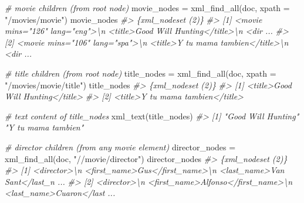 \documentclass[
]{book}
\newenvironment{Shaded}{\begin{snugshade}}{\end{snugshade}}
\newcommand{\AttributeTok}[1]{\textcolor[rgb]{0.77,0.63,0.00}{#1}}
\newcommand{\CommentTok}[1]{\textcolor[rgb]{0.56,0.35,0.01}{\textit{#1}}}
\newcommand{\FunctionTok}[1]{\textcolor[rgb]{0.00,0.00,0.00}{#1}}
\newcommand{\NormalTok}[1]{#1}
\newcommand{\OtherTok}[1]{\textcolor[rgb]{0.56,0.35,0.01}{#1}}
\newcommand{\StringTok}[1]{\textcolor[rgb]{0.31,0.60,0.02}{#1}}
\begin{document}
\begin{Shaded}
\begin{Highlighting}[]
\CommentTok{\# movie children (from root node)}
\NormalTok{movie\_nodes }\OtherTok{=} \FunctionTok{xml\_find\_all}\NormalTok{(doc, }\AttributeTok{xpath =} \StringTok{"/movies/movie"}\NormalTok{)}
\NormalTok{movie\_nodes}
\CommentTok{\#\textgreater{} \{xml\_nodeset (2)\}}
\CommentTok{\#\textgreater{} [1] \textless{}movie mins="126" lang="eng"\textgreater{}\textbackslash{}n  \textless{}title\textgreater{}Good Will Hunting\textless{}/title\textgreater{}\textbackslash{}n  \textless{}dir ...}
\CommentTok{\#\textgreater{} [2] \textless{}movie mins="106" lang="spa"\textgreater{}\textbackslash{}n  \textless{}title\textgreater{}Y tu mama tambien\textless{}/title\textgreater{}\textbackslash{}n  \textless{}dir ...}
\end{Highlighting}
\end{Shaded}

\begin{Shaded}
\begin{Highlighting}[]
\CommentTok{\# title children (from root node)}
\NormalTok{title\_nodes }\OtherTok{=} \FunctionTok{xml\_find\_all}\NormalTok{(doc, }\AttributeTok{xpath =} \StringTok{"/movies/movie/title"}\NormalTok{)}
\NormalTok{title\_nodes}
\CommentTok{\#\textgreater{} \{xml\_nodeset (2)\}}
\CommentTok{\#\textgreater{} [1] \textless{}title\textgreater{}Good Will Hunting\textless{}/title\textgreater{}}
\CommentTok{\#\textgreater{} [2] \textless{}title\textgreater{}Y tu mama tambien\textless{}/title\textgreater{}}
\end{Highlighting}
\end{Shaded}

\begin{Shaded}
\begin{Highlighting}[]
\CommentTok{\# text content of title\_nodes}
\FunctionTok{xml\_text}\NormalTok{(title\_nodes)}
\CommentTok{\#\textgreater{} [1] "Good Will Hunting" "Y tu mama tambien"}
\end{Highlighting}
\end{Shaded}

\begin{Shaded}
\begin{Highlighting}[]
\CommentTok{\# director children (from any movie element)}
\NormalTok{director\_nodes }\OtherTok{=} \FunctionTok{xml\_find\_all}\NormalTok{(doc, }\StringTok{"//movie/director"}\NormalTok{)}
\NormalTok{director\_nodes}
\CommentTok{\#\textgreater{} \{xml\_nodeset (2)\}}
\CommentTok{\#\textgreater{} [1] \textless{}director\textgreater{}\textbackslash{}n  \textless{}first\_name\textgreater{}Gus\textless{}/first\_name\textgreater{}\textbackslash{}n  \textless{}last\_name\textgreater{}Van Sant\textless{}/last\_n ...}
\CommentTok{\#\textgreater{} [2] \textless{}director\textgreater{}\textbackslash{}n  \textless{}first\_name\textgreater{}Alfonso\textless{}/first\_name\textgreater{}\textbackslash{}n  \textless{}last\_name\textgreater{}Cuaron\textless{}/last ...}
\end{Highlighting}
\end{Shaded}
\end{document}
